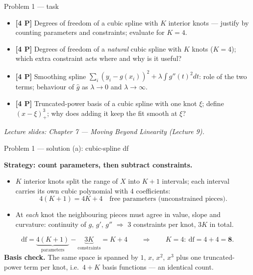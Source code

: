\documentclass[aspectratio=169,11pt]{beamer}
\begin{document}
\begin{frame}{Problem 1 --- task}
  \begin{exercise}
    \begin{itemize}
      \item[(a)] \textbf{[4 P]} Degrees of freedom of a cubic spline with $K$ interior knots ---
        justify by counting parameters and constraints; evaluate for $K=4$.
      \item[(b)] \textbf{[4 P]} Degrees of freedom of a \emph{natural} cubic spline with $K$ knots
        ($K=4$); which extra constraint acts where and why is it useful?
      \item[(c)] \textbf{[4 P]} Smoothing spline
        $\sum_i (y_i-g(x_i))^2+\lambda\int g''(t)^2dt$: role of the two terms;
        behaviour of $\hat g$ as $\lambda\to 0$ and $\lambda\to\infty$.
      \item[(d)] \textbf{[4 P]} Truncated-power basis of a cubic spline with one knot $\xi$;
        define $(x-\xi)^3_+$; why does adding it keep the fit smooth at $\xi$?
    \end{itemize}
  \end{exercise}
  {\scriptsize\itshape Lecture slides: Chapter 7 --- Moving Beyond Linearity (Lecture 9).}
\end{frame}

\begin{frame}{Problem 1 --- solution (a): cubic-spline df}
  \begin{solutionbox}
    \textbf{Strategy: count parameters, then subtract constraints.}
    \begin{itemize}
      \item $K$ interior knots split the range of $X$ into $K+1$ intervals; each interval carries
        its own cubic polynomial with $4$ coefficients:
        \[
          4(K+1)=4K+4\quad\text{free parameters (unconstrained pieces).}
        \]
      \item At \emph{each} knot the neighbouring pieces must agree in value, slope and curvature:
        continuity of $g,\,g',\,g''$ $\Rightarrow$ $3$ constraints per knot, $3K$ in total.
    \end{itemize}
    \[
      \mathrm{df}=\underbrace{4(K+1)}_{\text{parameters}}-\underbrace{3K}_{\text{constraints}}
      =K+4
      \qquad\Longrightarrow\qquad K=4:\ \mathrm{df}=4+4=\mathbf{8}.
    \]
    \textbf{Basis check.} The same space is spanned by $1,\,x,\,x^2,\,x^3$ plus one truncated-power
    term per knot, i.e.\ $4+K$ basis functions --- an identical count.
  \end{solutionbox}
\end{frame}
\end{document}
